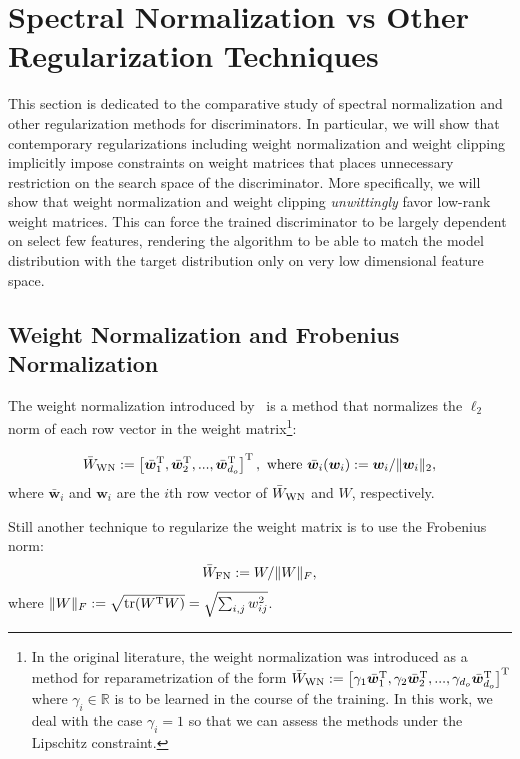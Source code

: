 \documentclass{article}
\newcommand{\bbR}{\mathbb{R}}
\newcommand{\bmw}{{\bm w}}
\begin{document}
\section{Spectral Normalization vs Other Regularization Techniques}
This section is dedicated to the comparative study of spectral normalization and other regularization methods for discriminators.
In particular, we will show that contemporary regularizations including weight normalization and weight clipping implicitly impose constraints on weight matrices that places unnecessary restriction on the search space of the discriminator.
More specifically, we will show that weight normalization and weight clipping \textit{unwittingly} favor low-rank weight matrices.
This can force the trained discriminator to be largely dependent on select few features, rendering the algorithm to be able to match the model distribution with the target distribution only on very low dimensional feature space.

\subsection{Weight Normalization and Frobenius Normalization}\label{subsubsec:wn_fn}
The weight normalization introduced by~\cite{salimans2016weight}
is a method that normalizes the $\ell_2$ norm of each row vector in the weight matrix\footnote{In the original literature, the weight normalization was introduced as a method for reparametrization of the form $\bar{W}_{\rm WN} := \left[\gamma_1\bar{\bmw}_1^{\rm T}, \gamma_2\bar{\bmw}_2^{\rm T},...,\gamma_{d_o}\bar{\bmw}_{d_o}^{\rm T}\right]^{\rm T}$ where $\gamma_i \in \bbR$ is to be learned in the course of the training.
In this work,  we deal with the case $\gamma_i=1 $ so that we can assess the methods under the Lipschitz constraint. }:

\begin{eqnarray}
	\bar{W}_{\rm WN} := \left[\bar{\bmw}_1^{\rm T}, \bar{\bmw}_2^{\rm T},...,\bar{\bmw}_{d_o}^{\rm T}\right]^{\rm T},~\text{where}~\bar{\bmw}_i(\bmw_i) := \bmw_i / \|\bmw_i\|_2, \label{eq:wn}
\end{eqnarray}
where $\bar{\bmw}_i$ and $\bmw_i$ are the $i$th row vector of  $\bar{W}_{\rm WN}$ and $W$, respectively.

Still another technique to regularize the weight matrix is to use the Frobenius norm:
\begin{align}
	\bar{W}_{\rm FN} := W / \|W\|_{F},
\end{align}
where $\|W\|_{F}:= \sqrt{\mathrm{tr}(W^{\rm T}W)} = \sqrt{\sum_{i,j} w_{ij}^2}$.
\end{document}
